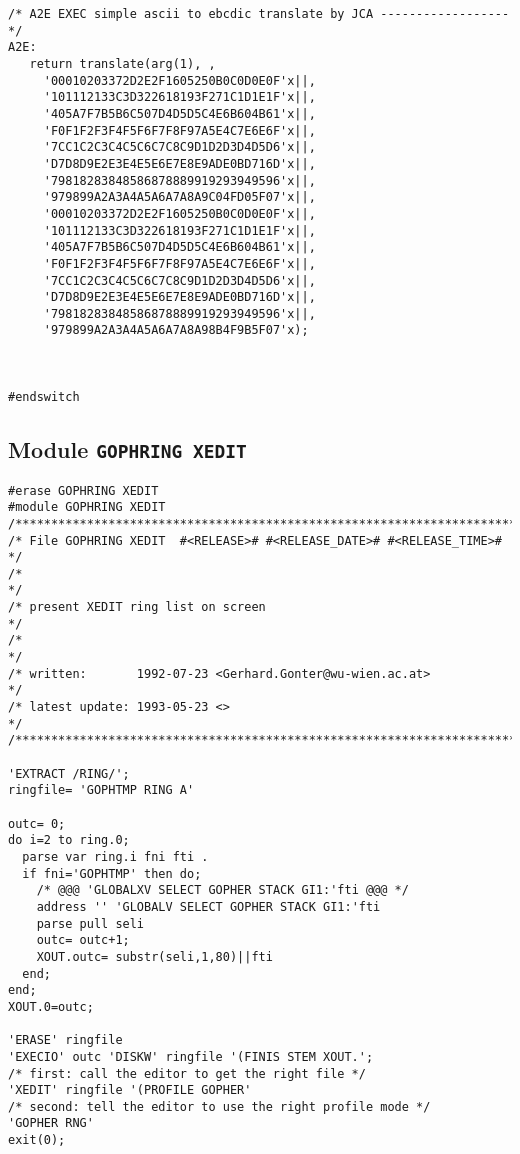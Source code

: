 \begin{verbatim}
/* A2E EXEC simple ascii to ebcdic translate by JCA ------------------ */
A2E:
   return translate(arg(1), ,
     '00010203372D2E2F1605250B0C0D0E0F'x||,
     '101112133C3D322618193F271C1D1E1F'x||,
     '405A7F7B5B6C507D4D5D5C4E6B604B61'x||,
     'F0F1F2F3F4F5F6F7F8F97A5E4C7E6E6F'x||,
     '7CC1C2C3C4C5C6C7C8C9D1D2D3D4D5D6'x||,
     'D7D8D9E2E3E4E5E6E7E8E9ADE0BD716D'x||,
     '79818283848586878889919293949596'x||,
     '979899A2A3A4A5A6A7A8A9C04FD05F07'x||,
     '00010203372D2E2F1605250B0C0D0E0F'x||,
     '101112133C3D322618193F271C1D1E1F'x||,
     '405A7F7B5B6C507D4D5D5C4E6B604B61'x||,
     'F0F1F2F3F4F5F6F7F8F97A5E4C7E6E6F'x||,
     '7CC1C2C3C4C5C6C7C8C9D1D2D3D4D5D6'x||,
     'D7D8D9E2E3E4E5E6E7E8E9ADE0BD716D'x||,
     '79818283848586878889919293949596'x||,
     '979899A2A3A4A5A6A7A8A98B4F9B5F07'x);



#endswitch
\end{verbatim}

\subsection{Module {\tt GOPHRING XEDIT}}

\def\LPtopD{Module {\tt GOPHRING XEDIT}}

\def\LPtopF{~}

\begin{verbatim}
#erase GOPHRING XEDIT
#module GOPHRING XEDIT
/***********************************************************************/
/* File GOPHRING XEDIT  #<RELEASE># #<RELEASE_DATE># #<RELEASE_TIME># */
/*                                                                     */
/* present XEDIT ring list on screen                                   */
/*                                                                     */
/* written:       1992-07-23 <Gerhard.Gonter@wu-wien.ac.at>            */
/* latest update: 1993-05-23 <>                                        */
/***********************************************************************/

'EXTRACT /RING/';
ringfile= 'GOPHTMP RING A'

outc= 0;
do i=2 to ring.0;
  parse var ring.i fni fti .
  if fni='GOPHTMP' then do;
    /* @@@ 'GLOBALXV SELECT GOPHER STACK GI1:'fti @@@ */
    address '' 'GLOBALV SELECT GOPHER STACK GI1:'fti
    parse pull seli
    outc= outc+1;
    XOUT.outc= substr(seli,1,80)||fti
  end;
end;
XOUT.0=outc;

'ERASE' ringfile
'EXECIO' outc 'DISKW' ringfile '(FINIS STEM XOUT.';
/* first: call the editor to get the right file */
'XEDIT' ringfile '(PROFILE GOPHER'
/* second: tell the editor to use the right profile mode */
'GOPHER RNG' 
exit(0);
\end{verbatim}

